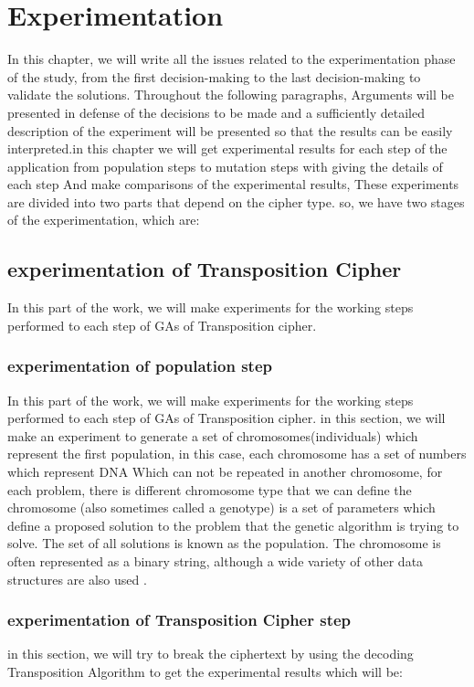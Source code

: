 \chapter{Experimentation}
In this chapter, we will write all the issues related to the experimentation phase of the study, from the first decision-making to the last decision-making to validate the solutions. Throughout the following paragraphs, Arguments will be presented in defense of the decisions to be made and a sufficiently detailed description of the experiment will be presented so that the results can be easily interpreted.in this chapter we will get experimental results for each step of the application from population steps to mutation steps with giving the details of each step And make comparisons of the experimental results, These experiments are divided into two parts that depend on the cipher type.
so, we have two stages of the experimentation, which are:

\section{experimentation of Transposition Cipher}
In this part of the work, we will make experiments for the working steps performed to each step of GAs of Transposition cipher.
\subsection{experimentation of population step}
In this part of the work, we will make experiments for the working steps performed to each step of GAs of Transposition cipher.
in this section, we will make an experiment to generate a set of chromosomes(individuals) which represent the first population,  in this case, each chromosome has a set of numbers which represent DNA Which can not be repeated in another chromosome, for each problem, there is different chromosome type that we can define the chromosome (also sometimes called a genotype) is a set of parameters which define a proposed solution to the problem that the genetic algorithm is trying to solve. The set of all solutions is known as the population. The chromosome is often represented as a binary string, although a wide variety of other data structures are also used \cite{IVGeneticAlgorithm}.\\


\newpage
\subsection{experimentation of Transposition Cipher step}
in this section, we will try to break the ciphertext by using the decoding Transposition Algorithm to get the experimental results which will be:


\newpage
